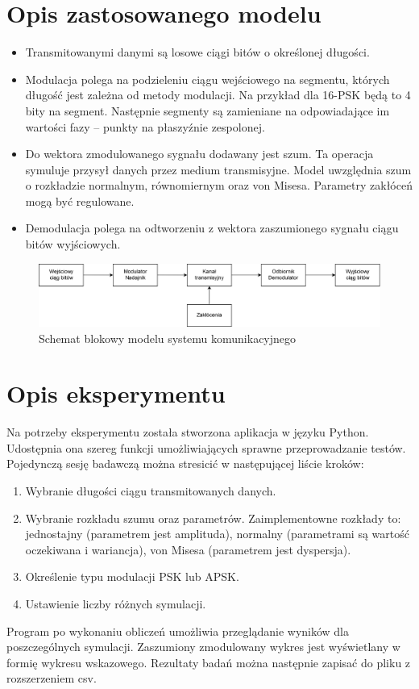 \documentclass{article}
\begin{document}
\section{Opis zastosowanego modelu}
	\begin{itemize}
		\item Transmitowanymi danymi są losowe ciągi bitów o określonej długości.
		\item Modulacja polega na podzieleniu ciągu wejściowego na segmentu, których długość jest zależna od metody modulacji. Na przykład dla 16-PSK będą to 4 bity na segment. Następnie segmenty są zamieniane na odpowiadające im wartości fazy -- punkty na płaszyźnie zespolonej.
		\item Do wektora zmodulowanego sygnału dodawany jest szum. Ta operacja symuluje przysył danych przez medium transmisyjne. Model uwzględnia szum o rozkładzie normalnym, równomiernym oraz von Misesa. Parametry zakłóceń mogą być regulowane.
		\item Demodulacja polega na odtworzeniu z wektora zaszumionego sygnału ciągu bitów wyjściowych.
	\end{itemize}

	\begin{figure}[H]
		\centering
		\includegraphics[width=\linewidth]{img/desc_model_block.png}
		\caption{Schemat blokowy modelu systemu komunikacyjnego}
		\label{fig:desc_model_block}
	\end{figure}

\section{Opis eksperymentu}
	Na potrzeby eksperymentu została stworzona aplikacja w języku Python. Udostępnia ona szereg funkcji umożliwiających sprawne przeprowadzanie testów. Pojedynczą sesję badawczą można stresicić w następującej liście kroków:
	\begin{enumerate}
		\item Wybranie długości ciągu transmitowanych danych.
		\item Wybranie rozkładu szumu oraz parametrów. Zaimplementowne rozkłady to: jednostajny (parametrem jest amplituda), normalny (parametrami są wartość oczekiwana i wariancja), von Misesa (parametrem jest dyspersja).
		\item Określenie typu modulacji PSK lub APSK. 
		\item Ustawienie liczby różnych symulacji.
	\end{enumerate} 
	Program po wykonaniu obliczeń umożliwia przeglądanie wyników dla poszczególnych symulacji. Zaszumiony zmodulowany wykres jest wyświetlany w formię wykresu wskazowego. Rezultaty badań można następnie zapisać do pliku z rozszerzeniem csv.
\end{document}
